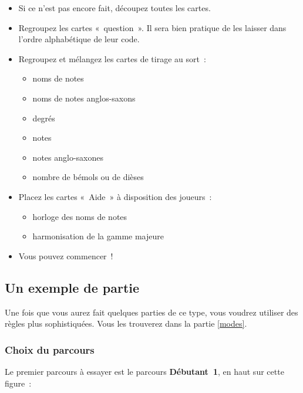 \documentclass[11pt]{article}
\newcommand{\parcours}[1]
{\textbf{#1}}
\begin{document}
\begin{itemize}
\item Si ce n’est pas encore fait, découpez toutes les cartes.
\item Regroupez les cartes « question ». Il sera bien pratique de les laisser
    dans l’ordre alphabétique de leur code.
\item Regroupez et mélangez les cartes de tirage au sort :
    \begin{itemize}
    \item noms de notes
    \item noms de notes anglos-saxons
    \item degrés
    \item notes
    \item notes anglo-saxones
    \item nombre de bémols ou de dièses
    \end{itemize}
\item Placez les cartes « Aide » à disposition des joueurs :
    \begin{itemize}
    \item horloge des noms de notes
    \item harmonisation de la gamme majeure
    \end{itemize}
\item Vous pouvez commencer !
\end{itemize}

\subsection{Un exemple de partie}

Une fois que vous aurez fait quelques parties de ce type, vous voudrez utiliser
des règles plus sophistiquées. Vous les trouverez dans la partie \ref{modes}.

\subsubsection{Choix du parcours}

Le premier parcours à essayer est le parcours \parcours{Débutant 1}, en haut
sur cette figure :

\end{document}
